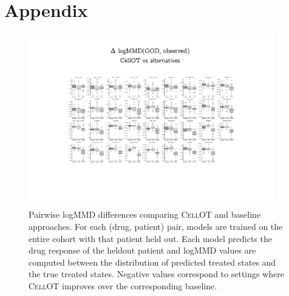 \chapter{Appendix}

\begin{figure}[h]
  \begin{center}
    \includegraphics[width=0.95\textwidth]{figures/cellot-cohort/ood-eval-logmmd.pdf}
  \end{center}
  \caption{
    Pairwise logMMD differences comparing \textsc{CellOT} and baseline approaches.
    For each (drug, patient) pair, models are trained on the entire cohort with that patient held out.
    Each model predicts the drug response of the heldout patient
    and logMMD values are computed between the distribution of predicted treated states and the true treated states.
    Negative values correspond to settings where \textsc{CellOT} improves over the corresponding baseline.
  }
\label{fig:ood-eval-logmmd}
\end{figure}

